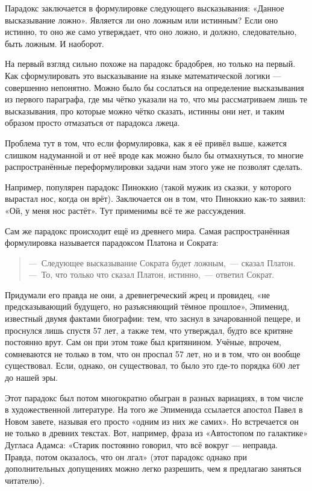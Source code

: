 Парадокс заключается в формулировке следующего высказывания: «Данное высказывание ложно». Является ли оно ложным или истинным? Если оно истинно, то оно же само утверждает, что оно ложно, и должно, следовательно, быть ложным. И нао\-бо\-рот.

На первый взгляд сильно похоже на парадокс брадобрея, но только на первый.  Как сформулировать это высказывание на языке математической логики — совершенно непонятно. Можно было бы сослаться на определение высказывания из первого параграфа, где мы чётко указали на то, что мы рассматриваем лишь те высказывания, про которые можно чётко сказать, истинны они нет, и таким образом просто отмазаться от парадокса лжеца.

Проблема тут в том, что если формулировка, как я её привёл выше, кажется слишком надуманной и от неё вроде как можно было бы отмахнуться, то многие распространённые переформулировки задачи нам этого уже не позволят сделать.

Например, популярен парадокс Пиноккио (такой мужик из сказки, у которого вырастал нос, когда он врёт). Заключается он в том, что Пиноккио как-то заявил: «Ой, у меня нос растёт». Тут применимы всё те же рассуждения.

Сам же парадокс происходит ещё из древнего мира. Самая распространённая формулировка называется парадоксом Платона и Сократа:

\begin{quote}
---~Следующее высказывание Сократа будет ложным,~— сказал Платон.\\
---~То, что только что сказал Платон, истинно,~— ответил Сократ.
\end{quote}

Придумали его правда не они, а древнегреческий жрец и провидец, «не предсказывающий будущего, но разъясняющий тёмное прошлое», Эпименид, известный двумя фактами биографии: тем, что заснул в зачарованной пещере, и проснулся лишь спустя 57 лет, а также тем, что утверждал, будто все критяне постоянно врут. Сам он при этом тоже был критянином. Учёные, впрочем, сомневаются не только в том, что он проспал 57 лет, но и в том, что он вообще существовал. Если, однако, он существовал, то было это где-то порядка 600 лет до нашей эры.

Этот парадокс был потом многократно обыгран в разных вариациях, в том числе в художественной литературе. На того же Эпименида ссылается апостол Павел в Новом завете, называя его просто «одним из них же самих». Но встречается он не только в древних текстах. Вот, например, фраза из «Автостопом по галактике» Дугласа Адамса: «Старик постоянно говорил, что всё вокруг — неправда. Правда, потом оказалось, что он лгал» (этот парадокс однако при дополнительных допущениях можно легко разрешить, чем я предлагаю заняться читателю).

